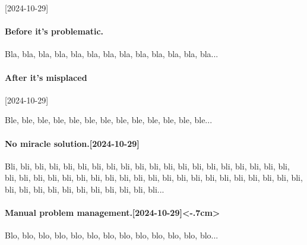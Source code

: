 [2024-10-29]%
\paragraph{Before it's problematic.}
Bla, bla, bla, bla, bla, bla, bla, bla, bla, bla, bla, bla, bla...


\paragraph{After it's misplaced}
[2024-10-29]

Ble, ble, ble, ble, ble, ble, ble, ble, ble, ble, ble, ble, ble...


\paragraph{No miracle solution.[2024-10-29]}

Bli, bli, bli, bli, bli, bli, bli, bli, bli, bli, bli, bli, bli,
bli, bli, bli, bli, bli, bli, bli, bli, bli, bli, bli, bli, bli,
bli, bli, bli, bli, bli, bli, bli, bli, bli, bli, bli, bli, bli,
bli, bli, bli, bli, bli, bli, bli, bli, bli, bli, bli, bli, bli...


\paragraph{Manual problem management.[2024-10-29]<-.7cm>}

Blo, blo, blo, blo, blo, blo, blo, blo, blo, blo, blo, blo, blo...
